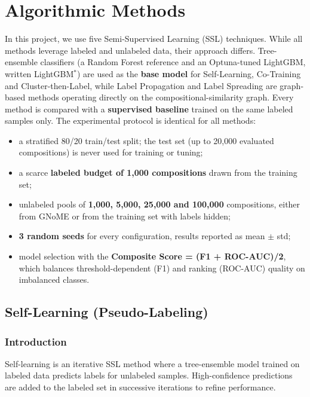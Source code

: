 \clearpage
\section{Algorithmic Methods}\label{sec:methods}

In this project, we use five Semi-Supervised Learning (SSL) techniques. While all methods
leverage labeled and unlabeled data, their approach differs. Tree-ensemble classifiers (a
Random Forest reference and an Optuna-tuned LightGBM, written LightGBM$^*$) are used as the
\textbf{base model} for Self-Learning, Co-Training and Cluster-then-Label, while Label
Propagation and Label Spreading are graph-based methods operating directly on the
compositional-similarity graph. Every method is compared with a \textbf{supervised baseline}
trained on the same labeled samples only. The experimental protocol is identical for all
methods:

\begin{itemize}
  \item a stratified 80/20 train/test split; the test set (up to 20,000 evaluated
  compositions) is never used for training or tuning;
  \item a scarce \textbf{labeled budget of 1,000 compositions} drawn from the training set;
  \item unlabeled pools of \textbf{1,000, 5,000, 25,000 and 100,000} compositions, either from
  GNoME or from the training set with labels hidden;
  \item \textbf{3 random seeds} for every configuration, results reported as mean $\pm$ std;
  \item model selection with the \textbf{Composite Score = (F1 + ROC-AUC)/2}, which balances
  threshold-dependent (F1) and ranking (ROC-AUC) quality on imbalanced classes.
\end{itemize}

\subsection{Self-Learning (Pseudo-Labeling)}

\subsubsection{Introduction}
Self-learning is an iterative SSL method where a tree-ensemble model trained on labeled data
predicts labels for unlabeled samples. High-confidence predictions are added to the labeled
set in successive iterations to refine performance.

